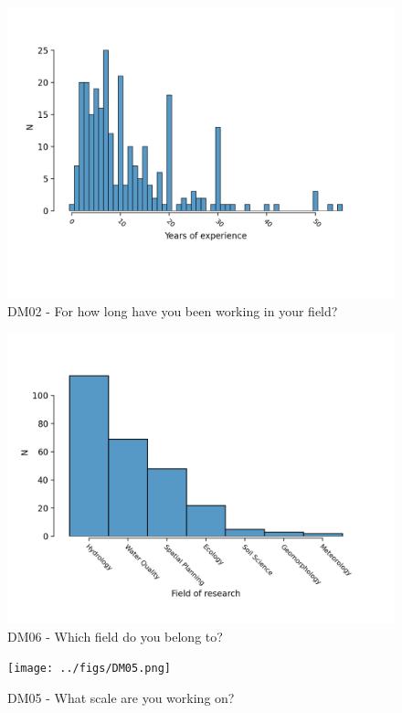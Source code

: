 \documentclass{article}
\begin{document}
\begin{figure}[h!]
    \centering
    \includegraphics[width=\textwidth]{../figs/DM02_01.png}
	\caption{DM02 - For how long have you been working in your field?}
    \label{fig:dm02}
\end{figure}

\begin{figure}[h!]
    \centering
    \includegraphics[width=\textwidth]{../figs/DM06.png}
	\caption{DM06 - Which field do you belong to?}
    \label{fig:dm06}
\end{figure}

\begin{figure}[h!]
    \centering
    \texttt{[image: ../figs/DM05.png]}
	\caption{DM05 - What scale are you working on?}
    \label{fig:dm05}
\end{figure}
\end{document}
